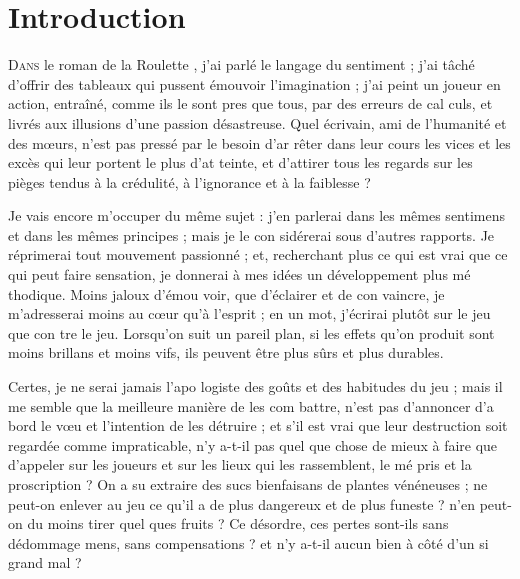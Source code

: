 \chapter{Introduction}

\lettrine{D}{ans} le roman de la Roulette \notemark,
j'ai parlé le langage du sentiment ;
j'ai tâché d'offrir des tableaux qui
pussent émouvoir l'imagination ;
j'ai peint un joueur en action,
entraîné, comme ils le sont pres%
que tous, par des erreurs de cal%
culs, et livrés aux illusions d'une
passion désastreuse. Quel écrivain,
ami de l'humanité et des mœurs,
n'est pas pressé par le besoin d'ar%
rêter dans leur cours les vices et les
excès qui leur portent le plus d'at%
teinte, et d'attirer tous les regards
sur les pièges tendus à la crédulité,
à l'ignorance et à la faiblesse ?

Je vais encore m'occuper du
même sujet : j'en parlerai dans les
mêmes sentimens et dans les
mêmes principes ; mais je le con%
sidérerai sous d'autres rapports.
Je réprimerai tout mouvement
passionné ; et, recherchant plus
ce qui est vrai que ce qui peut
faire sensation, je donnerai à mes
idées un développement plus mé%
thodique. Moins jaloux d'émou%
voir, que d'éclairer et de con%
vaincre, je m'adresserai moins au
cœur qu'à l'esprit ; en un mot,
j'écrirai plutôt sur le jeu que con%
tre le jeu. Lorsqu'on suit un pareil
plan, si les effets qu'on produit
sont moins brillans et moins vifs,
ils peuvent être plus sûrs et plus
durables.

Certes, je ne serai jamais l'apo%
logiste des goûts et des habitudes
du jeu ; mais il me semble que la
meilleure manière de les com%
battre, n'est pas d'annoncer d'a%
bord le vœu et l'intention de les
détruire ; et s'il est vrai que leur
destruction soit regardée comme
impraticable, n'y a-t-il pas quel%
que chose de mieux à faire que
d'appeler sur les joueurs et sur les
lieux qui les rassemblent, le mé%
pris et la proscription ? On a su
extraire des sucs bienfaisans de
plantes vénéneuses ; ne peut-on
enlever au jeu ce qu'il a de plus
dangereux et de plus funeste ?
n'en peut-on du moins tirer quel%
ques fruits ? Ce désordre, ces
pertes sont-ils sans dédommage%
mens, sans compensations ? et n'y
a-t-il aucun bien à côté d'un si
grand mal ?

